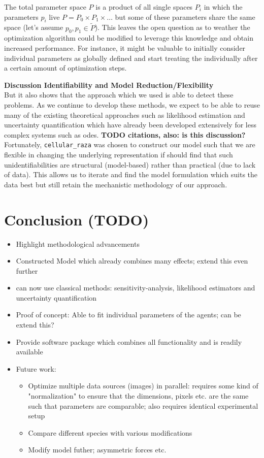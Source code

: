 \documentclass{article}
\begin{document}
The total parameter space $P$ is a product of all single spaces $P_i$ in which the parameters
$p_i$ live $P=P_0\times P_1\times\dots$ but some of these parameters share the same space (let's
assume $p_0,p_1\in \tilde{P}$).
This leaves the open question as to weather the optimization algorithm could be modified to leverage
this knowledge and obtain increased performance.
For instance, it might be valuable to initially consider individual parameters as globally defined
and start treating the individually after a certain amount of optimization steps.

\textbf{Discussion Identifiability and Model Reduction/Flexibility}\\
But it also shows that the approach which we used is able to detect these problems.
As we continue to develop these methods, we expect to be able to reuse many of the existing
theoretical approaches such as likelihood estimation and uncertainty quantification which have
already been developed extensively for less complex systems such as \acp{ode}.
\textbf{TODO citations, also: is this discussion?}
Fortunately, \texttt{cellular\_raza} was chosen to construct our model such that we are flexible in
changing the underlying representation if should find that such unidentifiabilities are structural
(model-based) rather than practical (due to lack of data).
This allows us to iterate and find the model formulation which suits the data best but still retain
the mechanistic methodology of our approach.

\section{Conclusion (TODO)}

\begin{itemize}
    \item Highlight methodological advancements
    \item Constructed Model which already combines many effects; extend this even further
    \item can now use classical methods: sensitivity-analysis, likelihood estimators and uncertainty quantification
    \item Proof of concept: Able to fit individual parameters of the agents; can be extend this?
    \item Provide software package which combines all functionality and is readily available
    \item Future work:
    \begin{itemize}
        \item Optimize multiple data sources (images) in parallel: requires some kind of
        "normalization" to ensure that the dimensions, pixels etc. are the same such that parameters
        are comparable; also requires identical experimental setup
        \item Compare different species with various modifications
        \item Modify model futher; asymmetric forces etc.
    \end{itemize}
\end{itemize}
\end{document}

